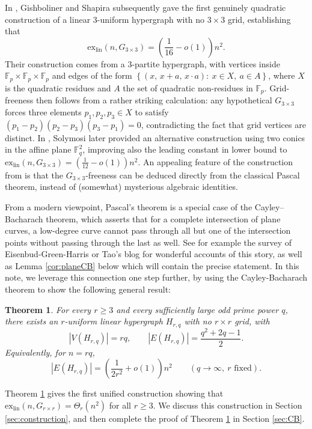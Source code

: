 \documentclass[11pt]{article}
\newtheorem{theorem}{Theorem}[section]
\theoremstyle{definition}
\theoremstyle{remark}
\begin{document}
In \cite{GishShapira}, Gishboliner and Shapira subsequently gave the first genuinely quadratic construction of a
linear $3$-uniform hypergraph with no $3\times3$ grid, establishing that
$$\mathrm{ex}_{\mathrm{lin}}(n,G_{3\times 3}) = \left(\frac{1}{16}-o(1)\right)n^2.$$
Their construction comes from a $3$-partite hypergraph, with vertices inside $\mathbb{F}_{p} \times \mathbb{F}_{p} \times \mathbb{F}_{p}$ and edges of the form $\left\{(x,\, x+a,\, x \cdot a):\ x \in X,\ a \in A\right\}$, where $X$ is the quadratic residues and $A$ the set of quadratic non-residues in $\mathbb{F}_p$. Grid-freeness then follows from a rather striking calculation: any hypothetical $G_{3 \times 3}$ forces three elements $p_1, p_2, p_3 \in X$ to satisfy $(p_1 - p_2)(p_2 - p_3)(p_3 - p_1) = 0$, contradicting the fact that grid vertices are distinct.
In \cite{Solymosi}, Solymosi later provided an alternative construction using two conics in the affine plane $\mathbb{F}_{q}^{2}$, improving also the leading constant in lower bound to $\mathrm{ex}_{\mathrm{lin}}(n,G_{3\times 3}) = \left(\frac{1}{12}-o(1)\right)n^2$. An appealing feature of the construction from \cite{Solymosi} is that the $G_{3 \times 3}$-freeness can be deduced directly from the classical Pascal theorem, instead of (somewhat) mysterious algebraic identities. 

From a modern viewpoint, Pascal's theorem is a special case of the Cayley--Bacharach theorem, which asserts that for a complete intersection of plane curves, a low-degree curve cannot pass through all but one of the intersection points without passing through the last as well. See for example the survey of Eisenbud-Green-Harris \cite{Eisenbud} or Tao's blog \cite{TaoBlog} for wonderful accounts of this story, as well as Lemma \ref{cor:planeCB} below which will contain the precise statement. In this note, we leverage this connection one step further, by using the Cayley-Bacharach theorem to show the following general result:

\begin{theorem}\label{thm:main}
For every $r \geq 3$ and every sufficiently large odd prime power $q$, there exists an $r$-uniform linear
hypergraph $H_{r,q}$ with no $r\times r$ grid, with
\[
|V(H_{r,q})| = rq,
\qquad
|E(H_{r,q})| = \frac{q^2+2q-1}{2}.
\]
Equivalently, for $n=rq$,
\[
|E(H_{r,q})|
=
\left(\frac{1}{2r^2}+o(1)\right)n^2
\qquad (q\to\infty,\ r\text{ fixed}).
\]
\end{theorem}

Theorem \ref{thm:main} gives the first unified construction showing that $\mathrm{ex}_{\mathrm{lin}}(n,G_{r\times r}) = \Theta_{r}(n^2)$ for all $r \geq 3$. We discuss this construction in Section \ref{sec:construction}, and then complete the proof of Theorem \ref{thm:main} in Section \ref{sec:CB}. 
\end{document}
